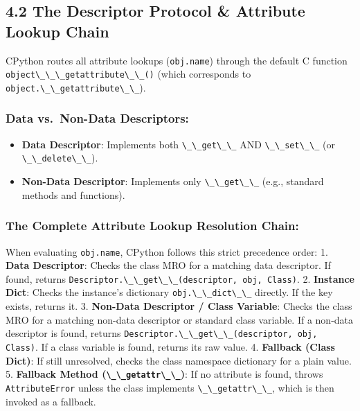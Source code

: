 \hypertarget{the-descriptor-protocol-attribute-lookup-chain}{%
\subsection{4.2 The Descriptor Protocol \& Attribute Lookup
Chain}\label{the-descriptor-protocol-attribute-lookup-chain}}

CPython routes all attribute lookups
(\passthrough{\lstinline!obj.name!}) through the default C function
\passthrough{\lstinline!object\_\_\_getattribute\_\_()!} (which
corresponds to \passthrough{\lstinline!object.\_\_getattribute\_\_!}).

\hypertarget{data-vs.-non-data-descriptors}{%
\subsubsection{Data vs.~Non-Data
Descriptors:}\label{data-vs.-non-data-descriptors}}

\begin{itemize}
\tightlist
\item
  \textbf{Data Descriptor}: Implements both
  \passthrough{\lstinline!\_\_get\_\_!} AND
  \passthrough{\lstinline!\_\_set\_\_!} (or
  \passthrough{\lstinline!\_\_delete\_\_!}).
\item
  \textbf{Non-Data Descriptor}: Implements only
  \passthrough{\lstinline!\_\_get\_\_!} (e.g., standard methods and
  functions).
\end{itemize}

\hypertarget{the-complete-attribute-lookup-resolution-chain}{%
\subsubsection{The Complete Attribute Lookup Resolution
Chain:}\label{the-complete-attribute-lookup-resolution-chain}}

When evaluating \passthrough{\lstinline!obj.name!}, CPython follows this
strict precedence order: 1. \textbf{Data Descriptor}: Checks the class
MRO for a matching data descriptor. If found, returns
\passthrough{\lstinline!Descriptor.\_\_get\_\_(descriptor, obj, Class)!}.
2. \textbf{Instance Dict}: Checks the instance's dictionary
\passthrough{\lstinline!obj.\_\_dict\_\_!} directly. If the key exists,
returns it. 3. \textbf{Non-Data Descriptor / Class Variable}: Checks the
class MRO for a matching non-data descriptor or standard class variable.
If a non-data descriptor is found, returns
\passthrough{\lstinline!Descriptor.\_\_get\_\_(descriptor, obj, Class)!}.
If a class variable is found, returns its raw value. 4. \textbf{Fallback
(Class Dict)}: If still unresolved, checks the class namespace
dictionary for a plain value. 5. \textbf{Fallback Method
(\passthrough{\lstinline!\_\_getattr\_\_!})}: If no attribute is found,
throws \passthrough{\lstinline!AttributeError!} unless the class
implements \passthrough{\lstinline!\_\_getattr\_\_!}, which is then
invoked as a fallback.

